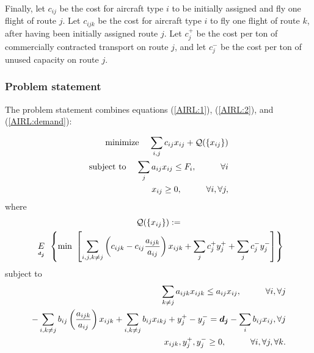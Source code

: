 Finally, let $c_{ij}$ be the cost for aircraft type $i$ to be initially assigned and fly one flight of route $j$.  Let $c_{ijk}$ be the cost for aircraft type $i$ to fly one flight of route $k$, after having been initially assigned route $j$.  Let $c_j^+$ be the cost per ton of commercially contracted transport on route $j$, and let $c_j^-$ be the cost per ton of unused capacity on route $j$.

\subsubsection{Problem statement}

The problem statement combines equations (\ref{AIRL:1}), (\ref{AIRL:2}), and (\ref{AIRL:demand}):

\vspace{0.5cm}


\begin{equation*}
\label{AIRL:problem}
\begin{split}
\mbox{minimize }\hspace{3mm}\sum_{i,j}c_{ij}x_{ij} + \mathcal{Q}(\{x_{ij}\})\\
\mbox{subject to }\hspace{3mm}\sum_j a_{ij}x_{ij} \leq F_i, \hspace{1cm} \forall i\\
x_{ij} \geq 0, \hspace{1cm} \forall i, \forall j,
\end{split}
\end{equation*}
where 
\begin{multline*}
\mathcal{Q}(\{x_{ij}\}) \assign\\
\expect[d_j]\left\{\mbox{min }\left[ \sum_{i,j,k\neq j}\left(c_{ijk} - c_{ij}\frac{a_{ijk}}{a_{ij}}\right)x_{ijk} + \sum_j c_j^+ y_j^+ + \sum_j c_j^- y_j^-\right]\right\}
\end{multline*}
\noindent subject to
\begin{eqnarray*}
\sum_{k \neq j} a_{ijk}x_{ijk} \leq a_{ij}x_{ij} , \hspace{1cm} \forall i, \forall j\\
- \sum_{i,k\neq j} b_{ij}\left(\frac{a_{ijk}}{a_{ij}}\right)x_{ijk} + \sum_{i,k\neq j} b_{ij} x_{ikj} + y_j^+ - y_j^- = \mathbf{\boldsymbol{d_j}} - \sum_{i} b_{ij}x_{ij}, \forall j\\
x_{ijk},y_j^+,y_j^- \geq 0, \hspace{1cm} \forall i, \forall j, \forall k.
\end{eqnarray*}


